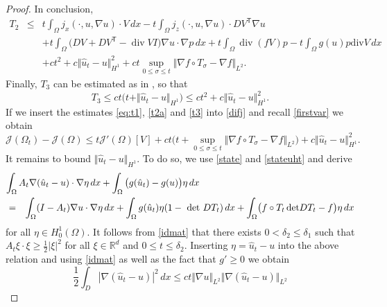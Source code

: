 \documentclass[10pt,a4paper]{amsart}
\DeclareMathOperator{\Div}{div}
\newcommand{\dx}{\,dx}
\begin{document}
\begin{proof}
In conclusion,
\begin{eqnarray}
T_2 & \leq &  t  \int_{\Omega} j_x(\cdot,u,\nabla u) \cdot V  \dx - t \int_{\Omega} j_z(\cdot,u,\nabla u) \cdot DV^{\mathsf{T}} \nabla u \nonumber \\
& & +  t \int_{\Omega} \bigl( D V + D V^{\mathsf{T}} - \Div V I  \bigr) \nabla u \cdot \nabla p  \dx + 
t \int_{\Omega} \Div( f V) p -t\int_{\Omega} g(u)p \mbox{div}V  \dx  \nonumber \\
& & +  c t^2 +c \Vert \hat u_t - u \Vert_{H^1}^2 + c t  \sup_{0 \leq \sigma \leq t} \Vert \nabla f \circ T_\sigma - \nabla f \Vert_{L^2}. \label{t2a}
\end{eqnarray}
Finally, $T_3$ can be estimated as in \cite[(3.19)]{DHH25-convergence},
so that 
\begin{equation} \label{t3}
T_3 \leq ct \bigl( t + \Vert \hat u_t - u \Vert_{H^1} \bigr) \leq c t^2 + c \Vert \hat u_t - u \Vert_{H^1}^2.
\end{equation}
If we insert the estimates \eqref{eq:t1}, \eqref{t2a} and \eqref{t3} into \eqref{difj} and recall \eqref{firstvar} we obtain
\begin{equation} \label{difj1}
\mathcal J(\Omega_t) - \mathcal J(\Omega)  \leq    t \mathcal J'(\Omega)[V]  + ct \bigl( t  +  \sup_{0 \leq \sigma \leq t} \Vert \nabla f \circ T_\sigma - \nabla f \Vert_{L^2} \bigr)
+ c \Vert \hat u_t - u \Vert^2_{H^1}.
\end{equation}
It remains to bound $\Vert \hat u_t - u \Vert_{H^1}$. To do so,  we use \eqref{state} and \eqref{stateuht} and derive
\begin{eqnarray*}
\lefteqn{\int_{\Omega} A_t  \nabla ( \hat u_t - u) \cdot \nabla \eta  \dx + \int_{\Omega}\big(g(\hat u_t)-g(u)\big)\eta \dx}\\ &=& \int_{\Omega} (I-A_t) \nabla u \cdot \nabla \eta  \dx + \int_{\Omega}g(\hat u_t)\eta (1-\mbox{ det }DT_t) \dx + \int_{\Omega} \bigl(
f \circ T_t  \, \mbox{det} D T_t -f \bigr) \eta  \dx
\end{eqnarray*}
for all $\eta \in H^1_0(\Omega)$.
It follows from  \eqref{idmat} that there exists $0< \delta_2 \leq \delta_1$ such that $A_t \xi \cdot \xi \geq \frac{1}{2} | \xi |^2$ for all $\xi \in \mathbb R^d$ and $0 \leq t \leq \delta_2$. Inserting $\eta=
\hat u_t-u$ into the above relation and using \eqref{idmat} as well as the
fact that $g' \geq 0$  we obtain
\begin{equation} \label{eq:hatu}
\frac{1}{2} \int_D |  \nabla (\hat u_t - u) |^2  \dx   \leq  c t \Vert \nabla u \Vert_{L^2} \Vert \nabla (\hat u_t - u) \Vert_{L^2}

\end{equation}
\end{proof}
\end{document}

